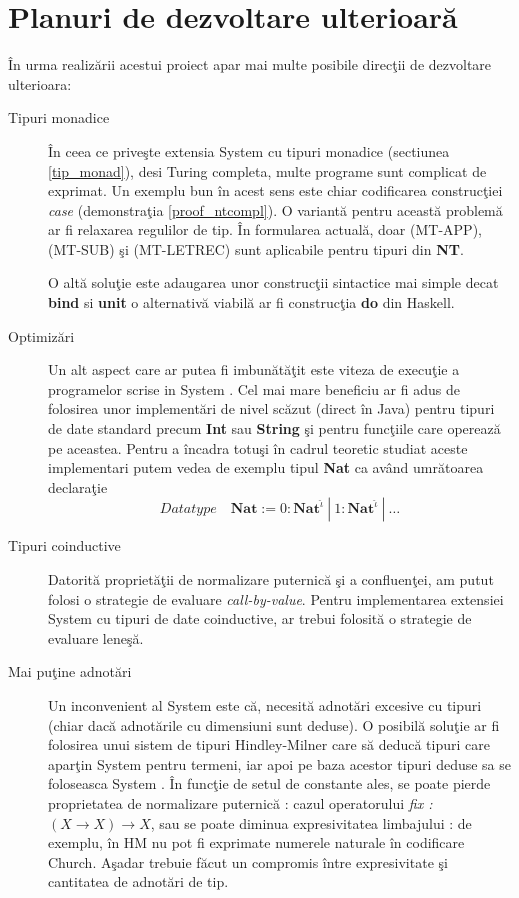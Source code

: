 
\chapter{Planuri de dezvoltare ulterioar\u a}
\label{Capitolul7}

\^ In urma realiz\u arii acestui proiect apar mai multe posibile direc\c tii de dezvoltare ulterioara:
\begin{description}
\item [ Tipuri monadice ] \^ In ceea ce prive\c ste extensia System \fhat cu tipuri monadice (sectiunea \ref{tip_monad}), desi Turing completa, multe programe sunt complicat de exprimat. Un exemplu bun \^ in acest sens este chiar codificarea construc\c tiei \emph{case} (demonstra\c tia \ref{proof_ntcompl}). O variant\u a pentru aceast\u a problem\u a ar fi relaxarea regulilor de tip. \^ In formularea actual\u a, doar {\scriptsize (MT-APP),(MT-SUB)} \c si {\scriptsize (MT-LETREC)} sunt aplicabile pentru tipuri din \textbf{NT}.

    O alt\u a solu\c tie este adaugarea unor construc\c tii sintactice mai simple decat \textbf{bind} si \textbf{unit} o alternativ\u a viabil\u a ar fi construc\c tia \textbf{do} din Haskell.

\item [ Optimiz\u ari ] Un alt aspect care ar putea fi imbun\u at\u a\c tit este viteza de execu\c tie a programelor scrise in System \fhat. Cel mai mare beneficiu ar  fi adus de folosirea unor implement\u ari de nivel sc\u azut (direct \^ in Java) pentru tipuri de date standard precum \textbf{Int} sau \textbf{String} \c si pentru func\c tiile care opereaz\u a pe aceastea. Pentru a \^ incadra totu\c si \^ in cadrul teoretic studiat aceste implementari putem vedea de exemplu tipul \textbf{Nat} ca av\^ and umr\u atoarea declara\c tie
    $$ Datatype \quad \textbf{Nat} := 0 : \textbf{Nat}^{\hat{\iota}} \:|\: 1 : \textbf{Nat}^{\hat{\iota}} \:| \: \dots $$

\item [ Tipuri coinductive ] Datorit\u a propriet\u a\c tii de normalizare puternic\u a \c si a confluen\c tei, am putut folosi o strategie de evaluare \emph{call-by-value}. Pentru implementarea extensiei System \fhat cu tipuri de date coinductive, ar trebui folosit\u a o strategie de evaluare lene\c s\u a.

\item [ Mai pu\c tine adnot\u ari ]  Un inconvenient al System \fhat este c\u a, necesit\u a adnot\u ari excesive cu tipuri (chiar dac\u a adnot\u arile cu dimensiuni sunt deduse). O posibil\u a solu\c tie ar fi folosirea unui sistem de tipuri Hindley-Milner care s\u a deduc\u a tipuri care apar\c tin System \frec pentru termeni, iar apoi pe baza acestor tipuri deduse sa se foloseasca System \fhat. \^ In func\c tie de setul de constante ales, se poate pierde proprietatea de normalizare puternic\u a : cazul operatorului \emph{fix : $(X \to X) \to X$}, sau se poate diminua expresivitatea limbajului : de exemplu, \^ in HM nu pot fi exprimate numerele naturale \^ in codificare Church. A\c sadar trebuie f\u acut un compromis \^ intre expresivitate \c si cantitatea de adnot\u ari de tip.
\end{description}
